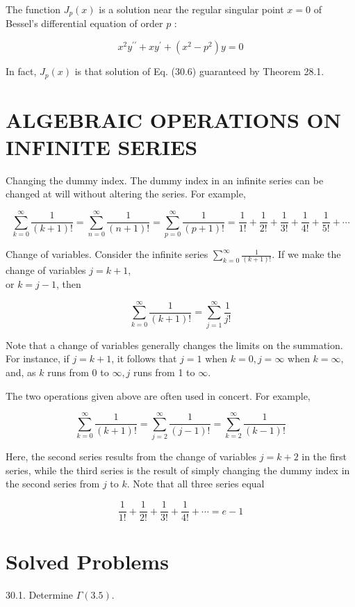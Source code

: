 \documentclass[10pt]{article}
\begin{document}
The function $J_{p}(x)$ is a solution near the regular singular point $x=0$ of Bessel's differential equation of order $p$ :


\begin{equation*}
x^{2} y^{\prime \prime}+x y^{\prime}+\left(x^{2}-p^{2}\right) y=0 \tag{30.6}
\end{equation*}


In fact, $J_{p}(x)$ is that solution of Eq. (30.6) guaranteed by Theorem 28.1.

\section*{ALGEBRAIC OPERATIONS ON INFINITE SERIES}
Changing the dummy index. The dummy index in an infinite series can be changed at will without altering the series. For example,

$$
\sum_{k=0}^{\infty} \frac{1}{(k+1) !}=\sum_{n=0}^{\infty} \frac{1}{(n+1) !}=\sum_{p=0}^{\infty} \frac{1}{(p+1) !}=\frac{1}{1 !}+\frac{1}{2 !}+\frac{1}{3 !}+\frac{1}{4 !}+\frac{1}{5 !}+\cdots
$$

Change of variables. Consider the infinite series $\sum_{k=0}^{\infty} \frac{1}{(k+1) !}$. If we make the change of variables $j=k+1$,\\
or $k=j-1$, then

$$
\sum_{k=0}^{\infty} \frac{1}{(k+1) !}=\sum_{j=1}^{\infty} \frac{1}{j !}
$$

Note that a change of variables generally changes the limits on the summation. For instance, if $j=k+1$, it follows that $j=1$ when $k=0, j=\infty$ when $k=\infty$, and, as $k$ runs from 0 to $\infty, j$ runs from 1 to $\infty$.

The two operations given above are often used in concert. For example,

$$
\sum_{k=0}^{\infty} \frac{1}{(k+1) !}=\sum_{j=2}^{\infty} \frac{1}{(j-1) !}=\sum_{k=2}^{\infty} \frac{1}{(k-1) !}
$$

Here, the second series results from the change of variables $j=k+2$ in the first series, while the third series is the result of simply changing the dummy index in the second series from $j$ to $k$. Note that all three series equal

$$
\frac{1}{1 !}+\frac{1}{2 !}+\frac{1}{3 !}+\frac{1}{4 !}+\cdots=e-1
$$

\section*{Solved Problems}
30.1. Determine $\Gamma(3.5)$.
\end{document}
